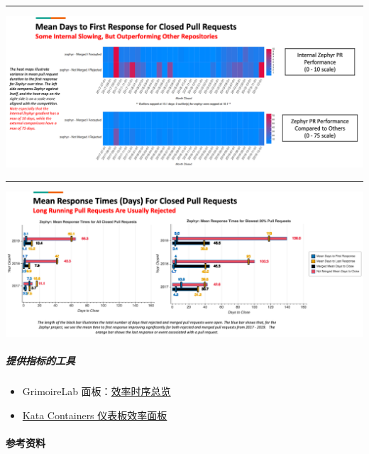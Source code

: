 \begin{center}\rule{0.5\linewidth}{0.5pt}\end{center}

\includegraphics{images/time-to-first-response_augur-ttc-1.png}

\begin{center}\rule{0.5\linewidth}{0.5pt}\end{center}

\includegraphics{images/time-to-first-response_augur-ttc-2.png}

\hypertarget{ux63d0ux4f9bux6307ux6807ux7684ux5de5ux5177}{%
\subparagraph{提供指标的工具}\label{ux63d0ux4f9bux6307ux6807ux7684ux5de5ux5177}}

\begin{itemize}
\tightlist
\item
  GrimoireLab
  面板：\href{https://chaoss.github.io/grimoirelab-sigils/panels/efficiency-timing-overview/}{效率时序总览}
\item
  \href{https://katacontainers.biterg.io/app/kibana\#/dashboard/cbbdd920-288c-11e9-b662-975152e57997}{Kata
  Containers 仪表板效率面板}
\end{itemize}

\hypertarget{ux53c2ux8003ux8d44ux6599}{%
\paragraph{参考资料}\label{ux53c2ux8003ux8d44ux6599}}
